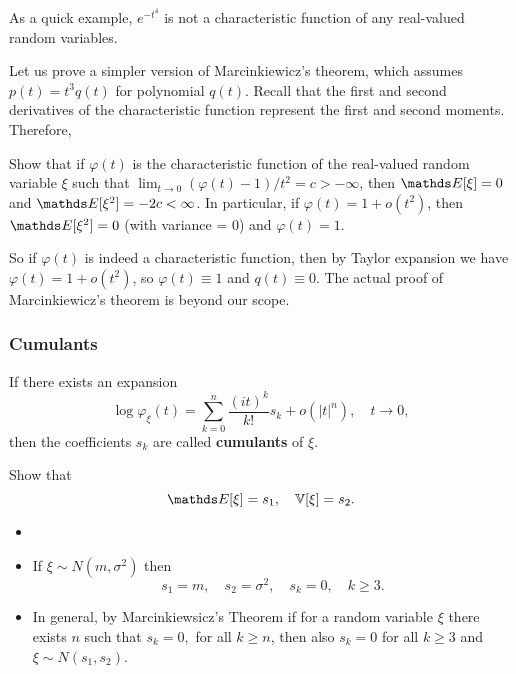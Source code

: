 \begin{example}
As a quick example, $e^{-t^4}$ is not a characteristic function of any real-valued random variables.
\end{example}

\begin{unexaminable}
Let us prove a simpler version of Marcinkiewicz's theorem, which assumes $p(t) = t^3 q(t)$ for polynomial $q(t)$. Recall that the first and second derivatives of the characteristic function represent the first and second moments. Therefore, 

\begin{exercise}
Show that if $\varphi(t)$ is the characteristic function of the real-valued random variable $\xi$ such that $\lim_{t\to 0 } (\varphi(t) - 1)/t^2 = c > -\infty$, then $\E[\xi] = 0$ and $\E[\xi^2] = -2c < \infty$. In particular, if $\varphi(t) = 1+o(t^2)$, then $\E[\xi^2] = 0$ (with variance = 0) and $\varphi(t) = 1$.
\end{exercise}

So if $\varphi(t)$ is indeed a characteristic function, then by Taylor expansion we have $\varphi(t) = 1+o(t^2)$, so $\varphi(t) \equiv 1$ and $q(t) \equiv 0$. The actual proof of Marcinkiewicz's theorem is beyond our scope.
\end{unexaminable}

\subsubsection{Cumulants}
\begin{definition}
If there exists an expansion 
\begin{equation*}
    \log \varphi_\xi(t) = \sum_{k=0}^n \frac{(it)^k}{k!} s_k + o(|t|^n), \quad t \to 0,
\end{equation*}
then the coefficients $s_k$ are called \textbf{cumulants} of $\xi$.
\end{definition}
\begin{exercise}
Show that 
\begin{equation*}
    \E[\xi] = s_1, \quad \V[\xi] = s_2.
\end{equation*}
\end{exercise}

\begin{remark}
\begin{itemize}
    \item[]
    \item If $\xi \sim N(m, \sigma^2)$ then
    \begin{equation*}
        s_1 = m, \quad s_2 = \sigma^2, \quad s_k = 0, \quad k\ge3.
    \end{equation*}
    \item In general, by Marcinkiewsicz's Theorem if for a random variable $\xi$ there exists $n$ such that $s_k = 0,$ for all $k \ge n$, then also $s_k = 0$ for all $k \ge 3$ and $\xi \sim N(s_1, s_2)$.
\end{itemize}
\end{remark}

